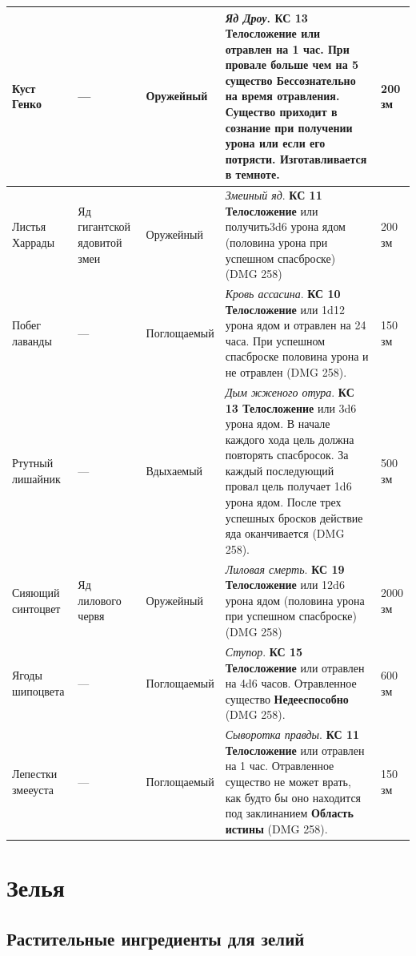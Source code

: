 \documentclass[a4paper, 9pt, twocolumn]{book}
\begin{document}
	\begin{tabular}{|m{2cm}|m{2cm}|m{2cm}|m{8cm}|m{2cm}|}
		\hline	
		\textbf{Куст Генко} & --- & Оружейный & \textit{Яд Дроу}. \textbf{КС 13 Телосложение} или отравлен на 1 час. При провале больше чем на 5 существо \textbf{Бессознательно} на время отравления. Существо приходит в сознание при получении урона или если его потрясти. Изготавливается в темноте. & 200 зм \\
		\hline
		Листья Харрады & Яд гигантской ядовитой змеи & Оружейный & \textit{Змеиный яд}. \textbf{КС 11 Телосложение} или получить3d6 урона ядом (половина урона при успешном спасброске) (DMG 258) & 200 зм \\
		\hline
		Побег лаванды & --- & Поглощаемый & \textit{Кровь ассасина}. \textbf{КС 10 Телосложение} или 1d12 урона ядом и отравлен на 24 часа. При успешном спасброске половина урона и не отравлен (DMG 258). & 150 зм \\
		\hline
		Ртутный лишайник & --- & Вдыхаемый & \textit{Дым жженого отура}. \textbf{КС 13 Телосложение} или 3d6 урона ядом. В начале каждого хода цель должна повторять спасбросок. За каждый последующий провал цель получает 1d6 урона ядом. После трех успешных бросков действие яда оканчивается (DMG 258). & 500 зм \\
		\hline
		Сияющий синтоцвет & Яд лилового червя & Оружейный & \textit{Лиловая смерть}. \textbf{КС 19 Телосложение} или 12d6 урона ядом (половина урона при успешном спасброске) (DMG 258) & 2000 зм \\
		\hline
		Ягоды шипоцвета & --- & Поглощаемый & \textit{Ступор}. \textbf{КС 15 Телосложение} или отравлен на 4d6 часов. Отравленное существо \textbf{Недееспособно} (DMG 258). & 600 зм \\
		\hline
		Лепестки змееуста & --- & Поглощаемый & \textit{Сыворотка правды}. \textbf{КС 11 Телосложение} или отравлен на 1 час. Отравленное существо не может врать, как будто бы оно находится под заклинанием \textbf{Область истины} (DMG 258). & 150 зм \\
		\hline
	\end{tabular}


	\section{Зелья}
	
	\subsection{Растительные ингредиенты для зелий}
\end{document}
